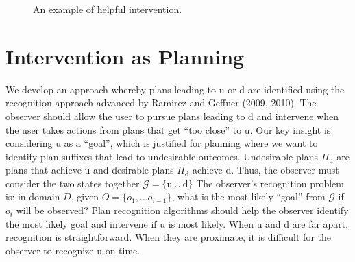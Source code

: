 \documentclass[doctor]{thesis} %
\theoremstyle{plain}
\begin{document}
\begin{figure}[ptb]
         \vspace{-1em}
        \caption{An example of helpful intervention.}
        \vspace{-1em}
        \label{fig:single}
\end{figure}
%
%
\section*{Intervention as Planning}
\label{sec:intervention}
We develop an approach whereby plans leading to $\mathrm{u}$ or $\mathrm{d}$ are identified using the recognition approach advanced by Ramirez and Geffner (2009, 2010).
The observer should allow the user to pursue plans leading to $\mathrm{d}$ and intervene when the user takes actions from plans that get ``too close'' to $\mathrm{u}$.
Our key insight is considering $\mathrm{u}$ as a ``goal'', which is justified for planning where we want to identify plan suffixes that lead to undesirable outcomes. 
Undesirable plans $\Pi_{\mathrm{u}}$ are plans that achieve $\mathrm{u}$ and desirable plans $\Pi_{\mathrm{d}}$ achieve $\mathrm{d}$. 
Thus, the observer must consider the two states together $\mathcal{G}=\lbrace\mathrm{u} \cup \mathrm{d}\rbrace$
The observer's recognition problem is: in domain $D$, given $O = \lbrace o_1, \ldots o_{i-1}\rbrace$, what is the most likely ``goal'' from $\mathcal{G}$ if $o_i$ will be observed? 
Plan recognition algorithms should help the observer identify the most likely goal and intervene if $\mathrm{u}$ is most likely.
When $\mathrm{u}$ and $\mathrm{d}$ are far apart, recognition is straightforward.
When they are proximate, it is difficult for the observer to recognize $\mathrm{u}$ on time.
\end{document}
